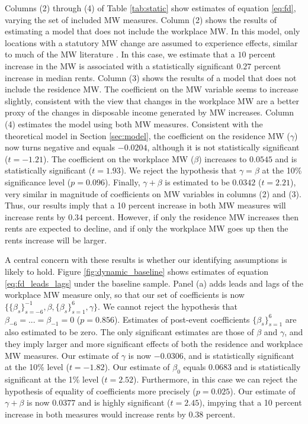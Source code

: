 Columns (2) through (4) of Table \ref{tab:static} show estimates of equation 
\eqref{eq:fd}, varying the set of included MW measures.
Column (2) shows the results of estimating a model that does not include the 
workplace MW.
In this model, only locations with a statutory MW change are assumed to 
experience effects, similar to much of the MW literature 
\parencite[e.g.,][]{DubeEtAl2010, MeerWest2016, Yamagishi2021}.
In this case, we estimate that a $10$ percent increase in the MW is associated 
with a statistically significant $0.27$ percent increase in median rents.
Column (3) shows the results of a model that does not include the residence MW.
The coefficient on the MW variable seems to increase slightly, consistent with 
the view that changes in the workplace MW are a better proxy of the changes in 
disposable income generated by MW increases.
Column (4) estimates the model using both MW measures.
Consistent with the theoretical model in Section \ref{sec:model}, the 
coefficient on the residence MW ($\gamma$) now turns negative and equals 
$-0.0204$, although it is not statistically significant ($t=-1.21$).
The coefficient on the workplace MW ($\beta$) increases to $0.0545$ and is 
statistically significant ($t=1.93$).
We reject the hypothesis that $\gamma=\beta$ at the 10\% significance level 
($p = 0.096$).
Finally, $\gamma+\beta$ is estimated to be $0.0342$ ($t=2.21$), very similar in
magnitude of coefficients on MW variables in columns (2) and (3).
Thus, our results imply that a 10 percent increase in both MW measures will 
increase rents by $0.34$ percent.
However, if only the residence MW increases then rents are expected to decline,
and if only the workplace MW goes up then the rents increase will be larger.

A central concern with these results is whether our identifying assumptions is 
likely to hold.
Figure \ref{fig:dynamic_baseline} shows estimates of equation 
\eqref{eq:fd_leads_lags} under the baseline sample.
Panel (a) adds leads and lags of the workplace MW measure only, so that
our set of coefficients is now 
$\{\{\beta_s\}_{s=-6}^{-1},\beta,\{\beta_s\}_{s=1}^6,\gamma\}$.
We cannot reject the hypothesis that $\beta_{-6}=...=\beta_{-1}=0$ 
($p = 0.856$).
Estimates of post-event coefficients $\{\beta_s\}_{s=1}^6$ are also estimated to 
be zero.
The only significant estimates are those of $\beta$ and $\gamma$, and they 
imply larger and more significant effects of both the residence and workplace MW
measures.
Our estimate of $\gamma$ is now $-0.0306$, and is statistically significant 
at the 10\% level ($t=-1.82$).
Our estimate of $\beta_0$ equals $0.0683$ and is statistically 
significant at the 1\% level ($t=2.52$).
Furthermore, in this case we can reject the hypothesis of equality of 
coefficients more precisely ($p = 0.025$).
Our estimate of $\gamma+\beta$ is now $0.0377$ and is highly significant 
($t=2.45$), impying that a 10 percent increase in both measures would increase
rents by $0.38$ percent.

